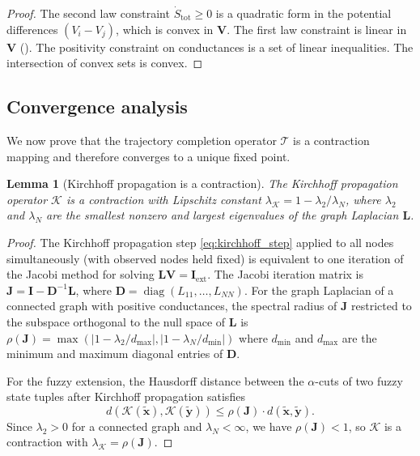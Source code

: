 \documentclass[twocolumn,10pt,a4paper]{article}
\newtheorem{lemma}[theorem]{Lemma}
\theoremstyle{definition}
\theoremstyle{remark}
\newcommand{\Tcal}{\mathcal{T}}
\newcommand{\vect}[1]{\boldsymbol{#1}}
\newcommand{\mat}[1]{\mathbf{#1}}
\newcommand{\fuzzy}[1]{\widetilde{#1}}
\DeclareMathOperator{\diag}{diag}
\begin{document}
\begin{proof}
The second law constraint $\dot{S}_{\mathrm{tot}} \geq 0$ is a quadratic form in the potential differences $(V_i - V_j)$, which is convex in $\vect{V}$. The first law constraint is linear in $\vect{V}$ (). The positivity constraint on conductances is a set of linear inequalities. The intersection of convex sets is convex.
\end{proof}

\subsection{Convergence analysis}

We now prove that the trajectory completion operator $\Tcal$ is a contraction mapping and therefore converges to a unique fixed point.

\begin{lemma}[Kirchhoff propagation is a contraction]\label{lem:kirchhoff_contraction}
The Kirchhoff propagation operator $\mathcal{K}$ is a contraction with Lipschitz constant $\lambda_{\mathcal{K}} = 1 - \lambda_2 / \lambda_N$, where $\lambda_2$ and $\lambda_N$ are the smallest nonzero and largest eigenvalues of the graph Laplacian $\mat{L}$.
\end{lemma}

\begin{proof}
The Kirchhoff propagation step \eqref{eq:kirchhoff_step} applied to all nodes simultaneously (with observed nodes held fixed) is equivalent to one iteration of the Jacobi method for solving $\mat{L}\vect{V} = \vect{I}_{\mathrm{ext}}$. The Jacobi iteration matrix is $\mat{J} = \mat{I} - \mat{D}^{-1}\mat{L}$, where $\mat{D} = \diag(L_{11}, \ldots, L_{NN})$. For the graph Laplacian of a connected graph with positive conductances, the spectral radius of $\mat{J}$ restricted to the subspace orthogonal to the null space of $\mat{L}$ is $\rho(\mat{J}) = \max(|1 - \lambda_2/d_{\max}|, |1 - \lambda_N/d_{\min}|)$ where $d_{\min}$ and $d_{\max}$ are the minimum and maximum diagonal entries of $\mat{D}$.

For the fuzzy extension, the Hausdorff distance between the $\alpha$-cuts of two fuzzy state tuples after Kirchhoff propagation satisfies
\begin{equation}
d(\mathcal{K}(\fuzzy{\vect{x}}), \mathcal{K}(\fuzzy{\vect{y}})) \leq \rho(\mat{J}) \cdot d(\fuzzy{\vect{x}}, \fuzzy{\vect{y}}).
\end{equation}
Since $\lambda_2 > 0$ for a connected graph and $\lambda_N < \infty$, we have $\rho(\mat{J}) < 1$, so $\mathcal{K}$ is a contraction with $\lambda_{\mathcal{K}} = \rho(\mat{J})$.
\end{proof}
\end{document}
